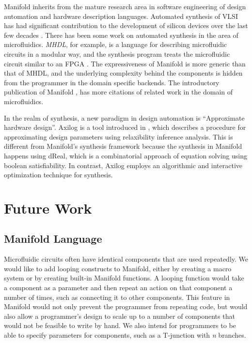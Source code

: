 Manifold inherits from the mature research area in software engineering of
design automation and hardware description languages. Automated synthesis of VLSI has had
significant contribution to the development of silicon devices over the last few decades
\cite{MeadConway80}. There has been some work on automated synthesis in the area of microfluidics.
\emph{MHDL}, for example, is a language for describing microfluidic circuits in a modular way, and the
synthesis program treats the microfluidic circuit similar to an FPGA \cite{McDaniel13aspdac}. The
expressiveness of Manifold is more generic than that of MHDL, and the underlying complexity behind
the components is hidden from the programmer in the domain specific backends. The introductory
publication of Manifold \cite{Berzish16cascon}, has more citations of related work in the domain of
microfluidics.

In the realm of synthesis, a new paradigm in design automation is ``Approximate hardware design''.
Axilog is a tool introduced in \cite{axilog}, which describes a procedure for approximating design
parameters using relaxibility inference analysis. This is different from Manifold's synthesis
framework because the synthesis in Manifold happens using dReal, which is a combinatorial approach
of equation solving using boolean satisfiability. In contrast, Axilog employs an algorithmic and
interactive optimization technique for synthesis.

\section{Future Work}

\subsection{Manifold Language}

Microfluidic circuits often have identical components that are used repeatedly.
We would like to add looping constructs to Manifold, either by creating a
macro system or by creating built-in Manifold functions. A looping function
would take a component as a parameter and then repeat an action on that
component a number of times, such as connecting it to other components.
This feature in Manifold would not only prevent the programmer from repeating
code, but would also allow a programmer's design to scale up to a number of
components that would not be feasible to write by hand. We also intend for
programmers to be able to specify parameters for components, such as a T-junction with \emph{n} branches.

